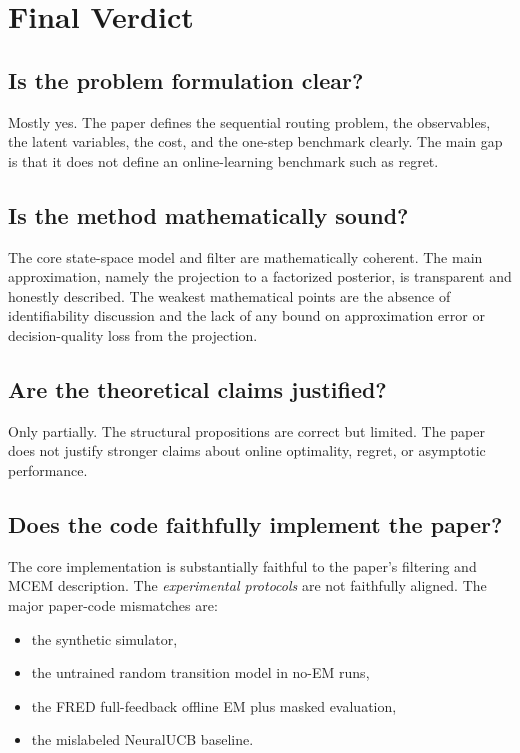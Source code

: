 \documentclass[11pt]{article}
\newcommand{\code}[1]{\texttt{\detokenize{#1}}}
\begin{document}
\section{Final Verdict}

\subsection{Is the problem formulation clear?}

Mostly yes. The paper defines the sequential routing problem, the observables,
the latent variables, the cost, and the one-step benchmark clearly. The main gap
is that it does not define an online-learning benchmark such as regret.

\subsection{Is the method mathematically sound?}

The core state-space model and filter are mathematically coherent. The main
approximation, namely the projection to a factorized posterior, is transparent
and honestly described. The weakest mathematical points are the absence of
identifiability discussion and the lack of any bound on approximation error or
decision-quality loss from the projection.

\subsection{Are the theoretical claims justified?}

Only partially. The structural propositions are correct but limited. The paper
does not justify stronger claims about online optimality, regret, or asymptotic
performance.

\subsection{Does the code faithfully implement the paper?}

The core \code{FactorizedSLDS} implementation is substantially faithful to the
paper's filtering and MCEM description. The \emph{experimental protocols} are
not faithfully aligned. The major paper-code mismatches are:
\begin{itemize}
    \item the synthetic simulator,
    \item the untrained random transition model in no-EM runs,
    \item the FRED full-feedback offline EM plus masked evaluation,
    \item the mislabeled NeuralUCB baseline.
\end{itemize}
\end{document}
